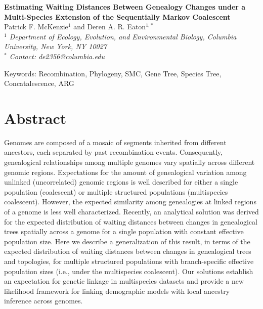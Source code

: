 \documentclass[11pt]{article}
\begin{document}
\begin{center}
	{\bf \Large
		Estimating Waiting Distances Between Genealogy Changes under a \\[0.25cm]
		Multi-Species Extension of the Sequentially Markov Coalescent
	}\\[0.5cm]

	Patrick F. McKenzie$^{1}$ and Deren A. R. Eaton$^{1, *}$\\[0.25cm]

	\emph{
	$^{1}$ Department of Ecology, Evolution, and Environmental Biology, Columbia University, New York, NY 10027\\[0.5cm]
	$^{*}$ Contact: de2356@columbia.edu\\[0.5cm]
	}
\end{center}

Keywords: Recombination, Phylogeny, SMC, Gene Tree, Species Tree, Concatalescence, ARG

\RaggedRight

\section*{Abstract}
Genomes are composed of a mosaic of segments inherited from different ancestors, 
each separated by past recombination events. Consequently, genealogical
relationships among multiple genomes vary spatially across different genomic 
regions. Expectations for the amount of genealogical variation among unlinked 
(uncorrelated) genomic regions is well described for either a single 
population (coalescent) or multiple structured populations (multispecies coalescent).
However, the expected similarity among genealogies at linked regions of a 
genome is less well characterized. 
Recently, an analytical solution was derived for the expected 
distribution of waiting distances between changes in genealogical trees 
spatially across a genome for a single population with constant effective 
population size. Here we describe a generalization of this 
result, in terms of the expected distribution of waiting distances between 
changes in genealogical trees and topologies, for multiple structured populations
with branch-specific effective population sizes (i.e., under the multispecies 
coalescent). Our solutions establish an expectation for genetic linkage  
in multispecies datasets and provide a new likelihood framework for linking
demographic models with local ancestry inference across genomes.
\end{document}
